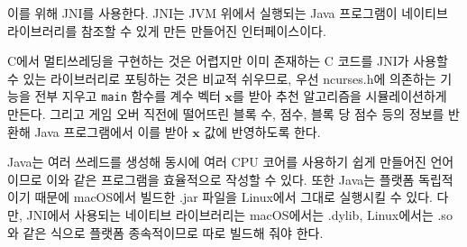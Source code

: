 이를 위해 JNI를 사용한다. JNI는 JVM
위에서 실행되는 Java 프로그램이 네이티브 라이브러리를 참조할 수 있게 만든 만들어진 인터페이스이다.

C에서 멀티쓰레딩을 구현하는 것은 어렵지만 이미 존재하는 C 코드를 JNI가 사용할 수 있는 라이브러리로 포팅하는
것은 비교적 쉬우므로, 우선 ncurses.h에 의존하는 기능을 전부 지우고 \texttt{main} 함수를 계수 벡터
$\mathbf{x}$를 받아 추천 알고리즘을 시뮬레이션하게 만든다. 그리고 게임 오버 직전에 떨어뜨린 블록 수,
점수, 블록 당 점수 등의 정보를 반환해 Java 프로그램에서 이를 받아 $\mathbf{x}$ 값에 반영하도록 한다.

Java는 여러 쓰레드를 생성해 동시에 여러 CPU 코어를 사용하기 쉽게 만들어진 언어이므로
이와 같은 프로그램을 효율적으로 작성할 수 있다. 또한 Java는 플랫폼 독립적이기 때문에 macOS에서 빌드한 .jar 파일을
Linux에서 그대로 실행시킬 수 있다. 다만, JNI에서 사용되는 네이티브 라이브러리는 macOS에서는
.dylib, Linux에서는 .so와 같은 식으로 플랫폼 종속적이므로 따로 빌드해 줘야 한다.